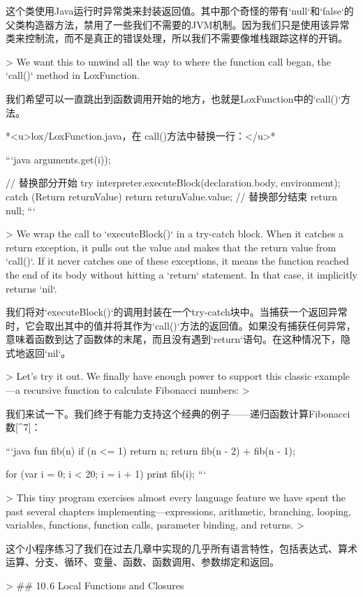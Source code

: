 \documentclass[cn,11pt,chinese]{elegantbook}
\begin{document}
{{{{{{{{这个类使用Java运行时异常类来封装返回值。其中那个奇怪的带有`null`和`false`的父类构造器方法，禁用了一些我们不需要的JVM机制。因为我们只是使用该异常类来控制流，而不是真正的错误处理，所以我们不需要像堆栈跟踪这样的开销。

> We want this to unwind all the way to where the function call began, the `call()` method in LoxFunction.

我们希望可以一直跳出到函数调用开始的地方，也就是LoxFunction中的`call()`方法。

*<u>lox/LoxFunction.java，在 call()方法中替换一行：</u>*

```java
         arguments.get(i));
    }
    // 替换部分开始
    try {
      interpreter.executeBlock(declaration.body, environment);
    } catch (Return returnValue) {
      return returnValue.value;
    }
    // 替换部分结束
    return null;
```

> We wrap the call to `executeBlock()` in a try-catch block. When it catches a return exception, it pulls out the value and makes that the return value from `call()`. If it never catches one of these exceptions, it means the function reached the end of its body without hitting a `return` statement. In that case, it implicitly returns `nil`.

我们将对`executeBlock()`的调用封装在一个try-catch块中。当捕获一个返回异常时，它会取出其中的值并将其作为`call()`方法的返回值。如果没有捕获任何异常，意味着函数到达了函数体的末尾，而且没有遇到`return`语句。在这种情况下，隐式地返回`nil`。

> Let’s try it out. We finally have enough power to support this classic example—a recursive function to calculate Fibonacci numbers:
>

我们来试一下。我们终于有能力支持这个经典的例子——递归函数计算Fibonacci数[^7]：

```java
fun fib(n) {
  if (n <= 1) return n;
  return fib(n - 2) + fib(n - 1);
}

for (var i = 0; i < 20; i = i + 1) {
  print fib(i);
}
```

> This tiny program exercises almost every language feature we have spent the past several chapters implementing—expressions, arithmetic, branching, looping, variables, functions, function calls, parameter binding, and returns.
>

这个小程序练习了我们在过去几章中实现的几乎所有语言特性，包括表达式、算术运算、分支、循环、变量、函数、函数调用、参数绑定和返回。

> ## 10 . 6 Local Functions and Closures

}}}}}}}
\end{document}
